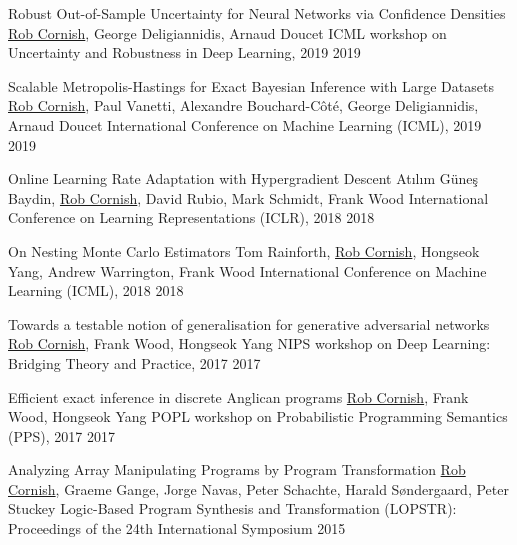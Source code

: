 \documentclass[9pt]{developercv} %
\begin{document}
\begin{entrylist}
    \publication
        {Robust Out-of-Sample Uncertainty for Neural Networks via Confidence Densities}
        {\underline{Rob Cornish}, George Deligiannidis, Arnaud Doucet}
        {ICML workshop on Uncertainty and Robustness in Deep Learning, 2019}
        {2019}

    \publication
        {Scalable Metropolis-Hastings for Exact Bayesian Inference with Large Datasets}
        {\underline{Rob Cornish}, Paul Vanetti, Alexandre Bouchard-C\^ot\'e, George Deligiannidis, Arnaud Doucet}
        {International Conference on Machine Learning (ICML), 2019}
        {2019}

    \publication
        {Online Learning Rate Adaptation with Hypergradient Descent}
        {At\i l\i m G\"une\c s Baydin, \underline{Rob Cornish}, David Rubio, Mark Schmidt, Frank Wood}
        {International Conference on Learning Representations (ICLR), 2018}
        {2018}

    \publication
        {On Nesting Monte Carlo Estimators}
        {Tom Rainforth, \underline{Rob Cornish}, Hongseok Yang, Andrew Warrington, Frank Wood}
        {International Conference on Machine Learning (ICML), 2018}
        {2018}

    \publication
        {Towards a testable notion of generalisation for generative adversarial networks}
        {\underline{Rob Cornish}, Frank Wood, Hongseok Yang}
        {NIPS workshop on Deep Learning: Bridging Theory and Practice, 2017}
        {2017}

    \publication
        {Efficient exact inference in discrete Anglican programs}
        {\underline{Rob Cornish}, Frank Wood, Hongseok Yang}
        {POPL workshop on Probabilistic Programming Semantics (PPS), 2017}
        {2017}

    \publication
        {Analyzing Array Manipulating Programs by Program Transformation}
        {\underline{Rob Cornish}, Graeme Gange, Jorge Navas, Peter Schachte, Harald S\o ndergaard, Peter Stuckey}
        {Logic-Based Program Synthesis and Transformation (LOPSTR): Proceedings of the 24th International Symposium}
        {2015}
\end{entrylist}

\vspace{-1em}

\end{document}
